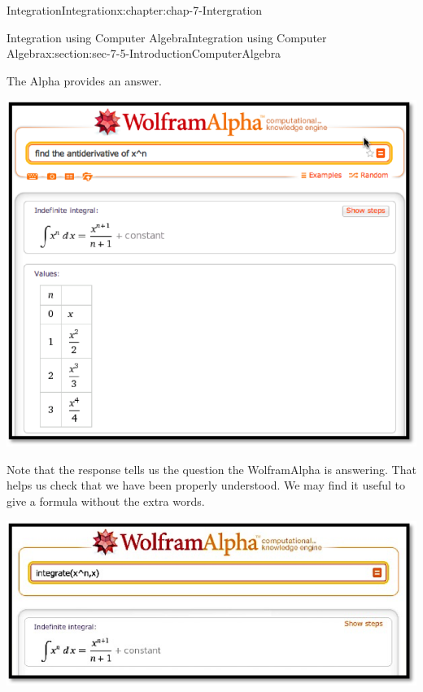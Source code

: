 \documentclass[oneside,10pt,]{book}
\numberwithin{equation}{section}
\begin{document}
\begin{chapterptx}{Integration}{}{Integration}{}{}{x:chapter:chap-7-Intergration}
\begin{sectionptx}{Integration using Computer Algebra}{}{Integration using Computer Algebra}{}{}{x:section:sec-7-5-IntroductionComputerAlgebra}
\begin{sidebyside}{1}{0.15}{0.15}{0}
\begin{sbspanel}{0.7}
\end{sbspanel}%
\end{sidebyside}%
\par
The Alpha provides an answer.%
\begin{sidebyside}{1}{0.15}{0.15}{0}%
\begin{sbspanel}{0.7}%
\includegraphics[width=\linewidth]{images/sec7-5-2.png}
\end{sbspanel}%
\end{sidebyside}%
\par
Note that the response tells us the question the Wolfram\textbar{}Alpha is answering.  That helps us check that we have been properly understood.  We may find it useful to give a formula without the extra words.%
\begin{sidebyside}{1}{0.15}{0.15}{0}%
\begin{sbspanel}{0.7}%
\includegraphics[width=\linewidth]{images/sec7-5-3.png}
\end{sbspanel}%
\end{sidebyside}%

\end{sectionptx}
\end{chapterptx}
\end{document}
